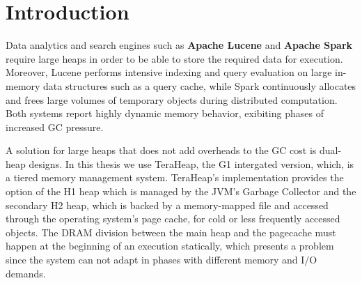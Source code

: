 \section{Introduction}



Data analytics and search engines such as \textbf{Apache Lucene}
\cite{klinaftakis2025thesis} and \textbf{Apache Spark} require large heaps in order 
to be able to store the required data for execution. Moreover, Lucene performs intensive indexing and query
evaluation on large in-memory data structures such as a query cache, while
Spark continuously allocates and frees large volumes of temporary objects
during distributed computation. Both systems report highly dynamic memory
behavior, exibiting phases of increased GC pressure.

A solution for large heaps that does not add overheads to the GC cost is dual-heap designs.
In this thesis we use TeraHeap, the G1 intergated version, which, is a
tiered memory management system. TeraHeap's implementation
provides the option of the H1 heap which is managed by the JVM's Garbage Collector and the secondary H2 heap, which is
backed by a memory-mapped file and accessed through the operating system's page cache, for cold or less frequently accessed objects. 
The DRAM division between the main heap and the pagecache must happen at the beginning of an execution statically, which
presents a problem since the system can not adapt in phases with different memory and I/O demands. 

